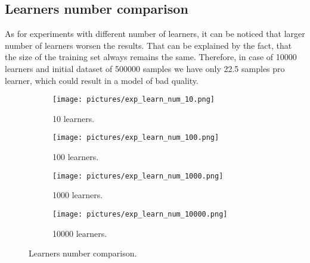 \documentclass{scrartcl}
\begin{document}
\subsection{Learners number comparison}
As for experiments with different number of learners, it can be noticed that larger number of learners worsen the results. That can be explained by the fact, that the size of the training set always remains the same. Therefore, in case of 10000 learners and initial dataset of 500000 samples we have only 22.5 samples pro learner, which could result in a model of bad quality.
\begin{figure}[H]
  \centering
  \begin{subfigure}[b]{0.45\linewidth}
    \texttt{[image: pictures/exp\_learn\_num\_10.png]}
    \caption{10 learners.}
  \end{subfigure}\hfill%
  \begin{subfigure}[b]{0.45\linewidth}
    \texttt{[image: pictures/exp\_learn\_num\_100.png]}
    \caption{100 learners.}
  \end{subfigure}
    \begin{subfigure}[b]{0.45\linewidth}
    \texttt{[image: pictures/exp\_learn\_num\_1000.png]}
    \caption{1000 learners.}
  \end{subfigure}\hfill%
      \begin{subfigure}[b]{0.45\linewidth}
    \texttt{[image: pictures/exp\_learn\_num\_10000.png]}
    \caption{10000 learners.}
  \end{subfigure}
  \caption{Learners number comparison.}
  \label{fig:learners}
\end{figure}
\end{document}
